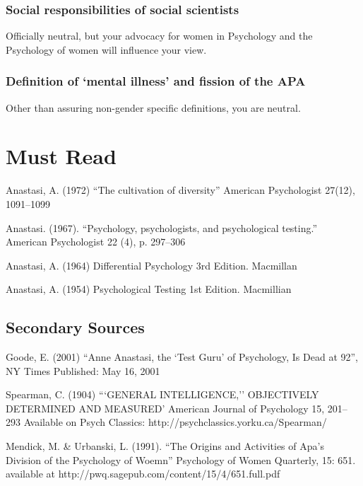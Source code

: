 \begin{refsection}
\subsubsection{Social responsibilities of social scientists}
\label{socialresponsibilitiesofsocialscientists}

Officially neutral, but your advocacy for women in Psychology and the Psychology of women will influence your view.

\subsubsection{Definition of ‘mental illness’ and fission of the APA}
\label{definitionof‘mentalillness’andfissionoftheapa}

Other than assuring non-gender specific definitions, you are neutral.

\section{Must Read}
\label{mustread}

Anastasi, A. (1972) “The cultivation of diversity” American Psychologist 27(12), 1091--1099

Anastasi. (1967). “Psychology, psychologists, and psychological testing.” American Psychologist 22 (4), p. 297--306

Anastasi, A. (1964) Differential Psychology 3rd Edition. Macmillan

Anastasi, A. (1954) Psychological Testing 1st Edition. Macmillian

\subsection{Secondary Sources}
\label{secondarysources}

Goode, E. (2001) “Anne Anastasi, the `Test Guru' of Psychology, Is Dead at 92”, NY Times Published: May 16, 2001

Spearman, C. (1904) ```GENERAL INTELLIGENCE,'' OBJECTIVELY DETERMINED AND MEASURED' American Journal of Psychology 15, 201--293 Available on Psych Classics: http:\slash \slash psychclassics.yorku.ca\slash Spearman\slash 

Mendick, M. \& Urbanski, L. (1991). “The Origins and Activities of Apa's Division of the Psychology of Woemn” Psychology of Women Quarterly, 15: 651. available at http:\slash \slash pwq.sagepub.com\slash content\slash 15\slash 4\slash 651.full.pdf


\end{refsection}
